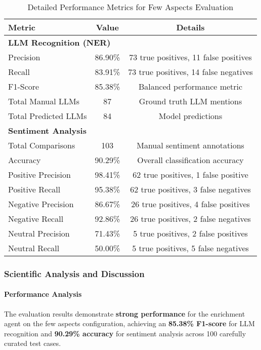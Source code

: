 \begin{table}[h]
\centering
\caption{Detailed Performance Metrics for Few Aspects Evaluation}
\label{tab:detailed_metrics}
\begin{tabular}{lcc}
\toprule
\textbf{Metric} & \textbf{Value} & \textbf{Details} \\
\midrule
\multicolumn{3}{l}{\textbf{LLM Recognition (NER)}} \\
Precision & 86.90\% & 73 true positives, 11 false positives \\
Recall & 83.91\% & 73 true positives, 14 false negatives \\
F1-Score & 85.38\% & Balanced performance metric \\
Total Manual LLMs & 87 & Ground truth LLM mentions \\
Total Predicted LLMs & 84 & Model predictions \\
\midrule
\multicolumn{3}{l}{\textbf{Sentiment Analysis}} \\
Total Comparisons & 103 & Manual sentiment annotations \\
Accuracy & 90.29\% & Overall classification accuracy \\
Positive Precision & 98.41\% & 62 true positives, 1 false positive \\
Positive Recall & 95.38\% & 62 true positives, 3 false negatives \\
Negative Precision & 86.67\% & 26 true positives, 4 false positives \\
Negative Recall & 92.86\% & 26 true positives, 2 false negatives \\
Neutral Precision & 71.43\% & 5 true positives, 2 false positives \\
Neutral Recall & 50.00\% & 5 true positives, 5 false negatives \\
\bottomrule
\end{tabular}
\end{table}

\subsubsection{Scientific Analysis and Discussion}

\paragraph{Performance Analysis}

The evaluation results demonstrate \textbf{strong performance} for the enrichment agent on the few aspects configuration, achieving an \textbf{85.38\% F1-score} for LLM recognition and \textbf{90.29\% accuracy} for sentiment analysis across 100 carefully curated test cases.


